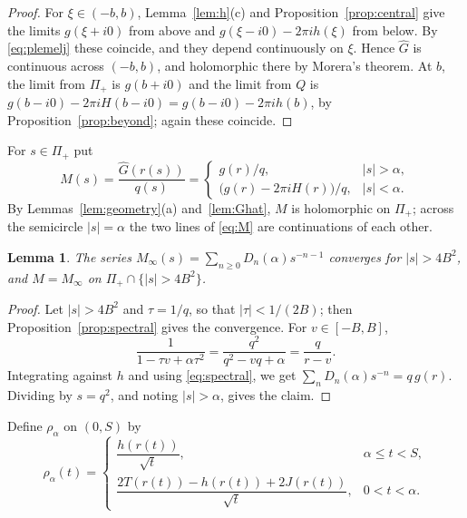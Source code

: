 \documentclass[11pt]{amsart}
\numberwithin{equation}{section}
\newtheorem{lemma}[theorem]{Lemma}
\theoremstyle{definition}
\theoremstyle{remark}
\newcommand{\Pip}{\Pi_{+}}
\begin{document}
\begin{proof}
For $\xi\in(-b,b)$, Lemma~\ref{lem:h}(c) and Proposition~\ref{prop:central} give
the limits $g(\xi+i0)$ from above and $g(\xi-i0)-2\pi ih(\xi)$ from below. By
\eqref{eq:plemelj} these coincide, and they depend continuously on $\xi$.
Hence $\widehat G$ is continuous across $(-b,b)$, and holomorphic there by
Morera's theorem. At $b$, the limit from $\Pip$ is $g(b+i0)$ and the limit
from $Q$ is $g(b-i0)-2\pi iH(b-i0)=g(b-i0)-2\pi ih(b)$, by
Proposition~\ref{prop:beyond}; again these coincide.
\end{proof}

For $s\in\Pip$ put
\begin{equation}\label{eq:M}
M(s)=\frac{\widehat G(r(s))}{q(s)}=
\begin{cases}
g(r)/q, & |s|>\alpha,\\
\bigl(g(r)-2\pi i H(r)\bigr)/q, & |s|<\alpha .
\end{cases}
\end{equation}
By Lemmas~\ref{lem:geometry}(a) and~\ref{lem:Ghat}, $M$ is holomorphic on
$\Pip$; across the semicircle $|s|=\alpha$ the two lines of \eqref{eq:M}
are continuations of each other.

\begin{lemma}\label{lem:germ}
The series $M_\infty(s)=\sum_{n\ge0}D_n(\alpha)s^{-n-1}$ converges for
$|s|>4B^2$, and $M=M_\infty$ on $\Pip\cap\{|s|>4B^2\}$.
\end{lemma}

\begin{proof}
Let $|s|>4B^2$ and $\tau=1/q$, so that $|\tau|<1/(2B)$; then
Proposition~\ref{prop:spectral} gives the convergence. For $v\in[-B,B]$,
\[
\frac{1}{1-\tau v+\alpha\tau^2}=\frac{q^2}{q^2-vq+\alpha}=\frac{q}{r-v} .
\]
Integrating against $h$ and using \eqref{eq:spectral}, we get
$\sum_nD_n(\alpha)s^{-n}=q\,g(r)$. Dividing by $s=q^2$, and noting
$|s|>\alpha$, gives the claim.
\end{proof}

Define $\rho_\alpha$ on $(0,S)$ by
\begin{equation}\label{eq:rho}
\rho_\alpha(t)=
\begin{cases}
\dfrac{h(r(t))}{\sqrt t}, & \alpha\le t<S,\\[2ex]
\dfrac{2T(r(t))-h(r(t))+2J(r(t))}{\sqrt t}, & 0<t<\alpha .
\end{cases}
\end{equation}
\end{document}
